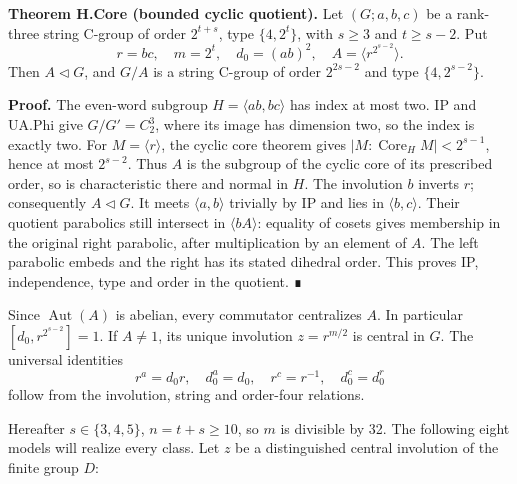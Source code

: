 \textbf{Theorem H.Core (bounded cyclic quotient).} Let \((G;a,b,c)\) be a rank-three string C-group of order \(2^{t+s}\), type \(\{4,2^t\}\), with \(s\ge3\) and \(t\ge s-2\). Put \[
 r=bc,\quad m=2^t,\quad d_0=(ab)^2,\quad
 A=\langle r^{2^{s-2}}\rangle.
\] Then \(A\lhd G\), and \(G/A\) is a string C-group of order \(2^{2s-2}\) and type \(\{4,2^{s-2}\}\).

\textbf{Proof.} The even-word subgroup \(H=\langle ab,bc\rangle\) has index at most two. IP and UA.Phi give \(G/G'=C_2^3\), where its image has dimension two, so the index is exactly two. For \(M=\langle r\rangle\), the cyclic core theorem gives \(|M:\operatorname{Core}_H M|<2^{s-1}\), hence at most \(2^{s-2}\). Thus \(A\) is the subgroup of the cyclic core of its prescribed order, so is characteristic there and normal in \(H\). The involution \(b\) inverts \(r\); consequently \(A\lhd G\). It meets \(\langle a,b\rangle\) trivially by IP and lies in \(\langle b,c\rangle\). Their quotient parabolics still intersect in \(\langle bA\rangle\): equality of cosets gives membership in the original right parabolic, after multiplication by an element of \(A\). The left parabolic embeds and the right has its stated dihedral order. This proves IP, independence, type and order in the quotient. ∎

Since \(\operatorname{Aut}(A)\) is abelian, every commutator centralizes \(A\). In particular \([d_0,r^{2^{s-2}}]=1\). If \(A\ne1\), its unique involution \(z=r^{m/2}\) is central in \(G\). The universal identities \[
 r^a=d_0r,\quad d_0^a=d_0,\quad r^c=r^{-1},\quad d_0^c=d_0^r       \tag{A-C1}
\] follow from the involution, string and order-four relations.

Hereafter \(s\in\{3,4,5\}\), \(n=t+s\ge10\), so \(m\) is divisible by 32. The following eight models will realize every class. Let \(z\) be a distinguished central involution of the finite group \(D\):

